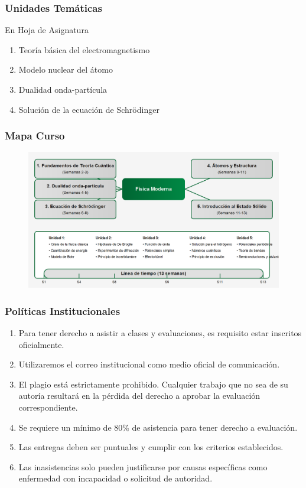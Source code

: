 \documentclass{beamer}
\begin{document}
\begin{frame}
    \frametitle{Unidades Temáticas}
    En Hoja de Asignatura
    \begin{enumerate}
    	\item Teoría básica del electromagnetismo  
    	\item Modelo nuclear del átomo 
    	\item Dualidad onda-partícula
    	\item Solución de la ecuación de Schrödinger
    \end{enumerate}
    
\end{frame}
\begin{frame}[plain]
	\frametitle{Mapa Curso}
	\begin{figure}
		\centering
		\includegraphics[width=1\linewidth]{../Imagenes/mapafisica.png}
	\end{figure}	
	
	\note{}	
\end{frame}

\begin{frame}
	\frametitle{Políticas Institucionales}
	\begin{enumerate}
		\item Para tener derecho a asistir a clases y evaluaciones, es requisito estar inscritos oficialmente.
		\item Utilizaremos el correo institucional como medio oficial de comunicación.
		\item El plagio está estrictamente prohibido. Cualquier trabajo que no sea de su autoría resultará en la pérdida del derecho a aprobar la evaluación correspondiente.
		\item Se requiere un mínimo de 80\% de asistencia para tener derecho a evaluación.
		\item Las entregas deben ser puntuales y cumplir con los criterios establecidos.
		\item Las inasistencias solo pueden justificarse por causas específicas como enfermedad con incapacidad o solicitud de autoridad.
	\end{enumerate}

\end{frame}	
\end{document}
